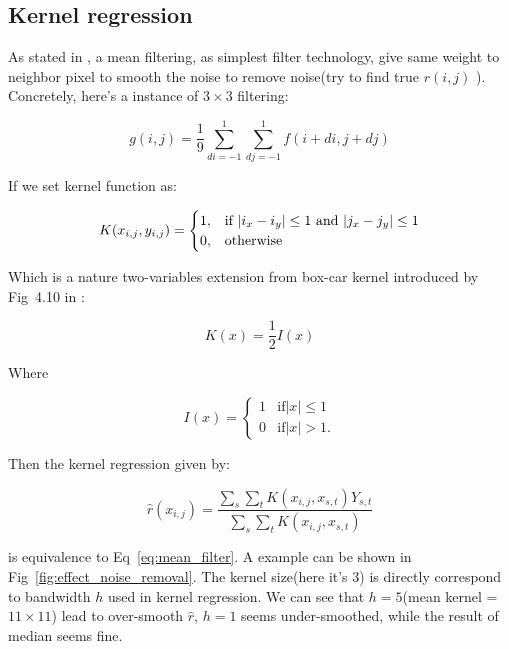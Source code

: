 \documentclass{article}
\begin{document}
\subsection{Kernel regression}

As stated in \cite{solomon2011fundamentals}, a mean filtering, as simplest filter technology, 
give same weight to neighbor pixel to smooth the noise to remove noise(try to find true $r(i,j)$ ). 
Concretely, here's a instance of $3 \times 3$ filtering:

\begin{equation}
g(i,j) = \frac{1}{9} \sum_{di=-1}^1 \sum_{dj=-1}^1 f(i+di,j+dj)
\label{eq:mean_filter}
\end{equation}

If we set kernel function as:

$$ 
K(x_{i,j},y_{i,j}) =  
\begin{cases}
  1, & \text{if $ |i_x - i_y| \le 1$ and $|j_x - j_y| \le 1$} \\
  0, & \text{otherwise}
\end{cases}
$$

Which is a nature two-variables extension from box-car kernel introduced by Fig~4.10 in \cite{wasserman2006all}:

$$
K(x) = \frac{1}{2} I(x)
$$

Where 

$$
I(x) = \begin{cases}
  1 & \text{if} |x| \le 1 \\
  0 & \text{if} |x| >1.
\end{cases}
$$

Then the kernel regression given by:

$$
\hat{r}(x_{i,j}) = \frac{\sum_{s} \sum_{t} K(x_{i,j},x_{s,t}) Y_{s,t}}{\sum_{s} \sum_{t} K(x_{i,j},x_{s,t})}
$$

is equivalence to Eq~\ref{eq:mean_filter}. A example can be shown in Fig~\ref{fig:effect_noise_removal}. 
The kernel size(here it's $3$) is directly correspond to bandwidth $h$ used in kernel regression. 
We can see that $h=5$(mean kernel = $11 \times 11 $) lead to over-smooth $\hat{r}$, $h=1$ seems under-smoothed,
while the result of median seems fine.
\end{document}
